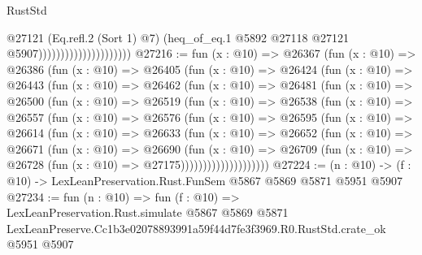 \begin{lexlean}{RustStd}
\begin{coremodule}
                                            @27121
                                            (Eq.refl.{2} (Sort 1) @7)
                                            (heq_of_eq.{1}
                                              @5892
                                              @27118
                                              @27121
                                              @5907)))))))))))))))))))))
@27216 := fun (x : @10) =>
  @26367
    (fun (x : @10) =>
    @26386
      (fun (x : @10) =>
      @26405
        (fun (x : @10) =>
        @26424
          (fun (x : @10) =>
          @26443
            (fun (x : @10) =>
            @26462
              (fun (x : @10) =>
              @26481
                (fun (x : @10) =>
                @26500
                  (fun (x : @10) =>
                  @26519
                    (fun (x : @10) =>
                    @26538
                      (fun (x : @10) =>
                      @26557
                        (fun (x : @10) =>
                        @26576
                          (fun (x : @10) =>
                          @26595
                            (fun (x : @10) =>
                            @26614
                              (fun (x : @10) =>
                              @26633
                                (fun (x : @10) =>
                                @26652
                                  (fun (x : @10) =>
                                  @26671
                                    (fun (x : @10) =>
                                    @26690
                                      (fun (x : @10) =>
                                      @26709
                                        (fun (x : @10) =>
                                        @26728 (fun (x : @10) => @27175))))))))))))))))))))
@27224 := (n : @10) -> (f : @10) -> LexLeanPreservation.Rust.FunSem @5867 @5869 @5871 @5951 @5907
@27234 := fun (n : @10) =>
  fun (f : @10) =>
  LexLeanPreservation.Rust.simulate
    @5867
    @5869
    @5871
    LexLeanPreserve.Cc1b3e02078893991a59f44d7fe3f3969.R0.RustStd.crate_ok
    @5951
    @5907
\end{coremodule}
\end{lexlean}
